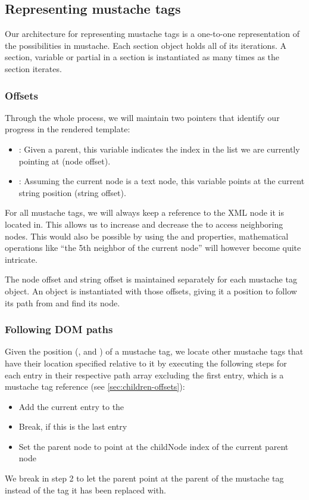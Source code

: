 \documentclass[thesis.tex]{subfiles}
\begin{document}
\subsection{Representing mustache tags}
Our architecture for representing mustache tags is a one-to-one representation
of the possibilities in mustache.
Each section object holds all of its iterations. A section, variable or partial
in a section is instantiated as many times as the section iterates.

\subsubsection{Offsets}
Through the whole process, we will maintain two pointers that identify our
progress in the rendered template:
\begin{itemize}
\item {}: Given a parent, this variable indicates the index
      in the  list we are currently pointing at (node offset).
\item {}: Assuming the current node is a text node, this variable
      points at the current string position (string offset).
\end{itemize}

For all mustache tags, we will always keep a reference to the 
XML node it is located in. This allows us to increase and decrease the
 to access neighboring nodes. This would also be possible by
using the  and  properties,
mathematical operations like ``the 5th neighbor of the current node'' will
however become quite intricate.

The node offset and string offset is maintained separately for each mustache tag
object. An object is instantiated with those offsets, giving it a position to
follow its path from and find its node.

\subsubsection{Following DOM paths}
Given the position (,  and )
of a mustache tag, we locate other mustache tags that have their location
specified relative to it by executing the following steps for each entry in
their respective path array
excluding the first entry, which is a mustache tag reference
(see \ref{sec:children-offsets}):
\begin{itemize}
\item Add the current entry to the 
\item Break, if this is the last entry
\item Set the parent node to point at the childNode index  of
      the current parent node
\end{itemize}
We break in step 2 to let the parent point at the parent of the mustache tag
instead of the tag it has been replaced with.
\end{document}
